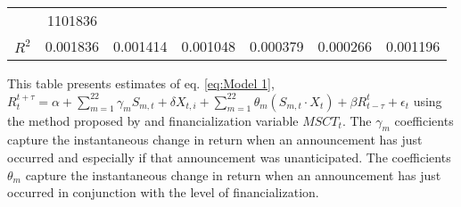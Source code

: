 \begin{sidewaystable}
{\begin{tabular}{@{}lllllllllllll@{}}
     & \multicolumn{2}{c}{ 1101836 }                                                 \\ \textbf{$R^2$}             &\multicolumn{2}{c}{ 0.001836 }                                                 & \multicolumn{2}{c}{ 0.001414 }                                                 & \multicolumn{2}{c}{ 0.001048 }                                                 & \multicolumn{2}{c}{ 0.000379 }                                                 & \multicolumn{2}{c}{ 0.000266 }                                                   & \multicolumn{2}{c}{ 0.001196 }                                                 \\ \bottomrule 
\end{tabular}
}
\begin{tablenotes}\item 
    \singlespacing
    \footnotesize
    This table presents estimates of eq. \ref{eq:Model 1}, $R_{t}^{t+\tau}=\alpha+\sum_{m=1}^{22} \gamma_m S_{m,t}+ \delta X_{t,i} + \sum_{m=1}^{22} \theta_m (S_{m,t} \cdot X_t)+\beta R_{t-\tau}^{t}+\epsilon_{t}$ using the method proposed by \citet{kurov2019price} and financialization variable $MSCT_t$. The $\gamma_m$ coefficients capture the instantaneous change in return when an announcement has just occurred and especially if that announcement was unanticipated. The coefficients $\theta_m$ capture the instantaneous change in return when an announcement has just occurred in conjunction with the level of financialization.
\end{tablenotes}
\end{sidewaystable}

